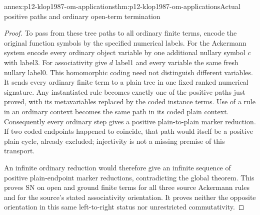\begin{annexitem}{annex:p12-klop1987-om-applications}{thm:p12-klop1987-om-applications}{Actual positive paths and ordinary open-term termination}
\begin{proof}
To pass from these tree paths to all ordinary finite terms, encode
the original function symbols by the specified numerical labels.
For the Ackermann system encode every ordinary object variable by
one additional nullary symbol \(c\) with label3. For associativity
give \(d\) label1 and every variable the same fresh nullary label0.
This homomorphic coding need not distinguish different variables.
It sends every ordinary finite term to a plain tree in one fixed
ranked numerical signature. Any instantiated rule becomes exactly
one of the positive paths just proved, with its metavariables
replaced by the coded instance terms. Use of a rule in an ordinary
context becomes the same path in its coded plain context. Consequently
every ordinary step gives a positive plain-to-plain marker reduction.
If two coded endpoints happened to coincide, that path would itself
be a positive plain cycle, already excluded; injectivity is not a
missing premise of this transport.

An infinite ordinary reduction would therefore give an infinite
sequence of positive plain-endpoint marker reductions, contradicting
the global theorem. This proves SN on open and ground finite terms
for all three source Ackermann rules and for the source's stated
associativity orientation. It proves neither the opposite orientation
in this same left-to-right status nor unrestricted commutativity.
\end{proof}
\end{annexitem}
